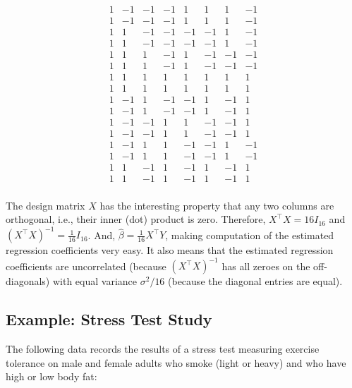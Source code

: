 \documentclass[
]{book}
\begin{document}
\[\begin{matrix}
 1 & -1 & -1 & -1 &  1& 1& 1& -1 \\
 1 & -1 & -1 & -1 &  1& 1& 1& -1 \\
 1 & 1 & -1 & -1 &  -1& -1& 1& -1 \\
 1 & 1 & -1 & -1 &  -1& -1& 1& -1 \\
 1 & 1 & 1 & -1 &  1& -1& -1& -1 \\
 1 & 1 & 1 & -1 &  1& -1& -1& -1 \\
 1 & 1 & 1 & 1 &  1& 1& 1& 1 \\
 1 & 1 & 1 & 1 &  1& 1& 1& 1 \\
 1 & -1 & 1 & -1 &  -1& 1& -1& 1 \\
 1 & -1 & 1 & -1 &  -1& 1& -1& 1 \\
 1 & -1 & -1 & 1 &  1& -1& -1& 1 \\
 1 & -1 & -1 & 1 &  1& -1& -1& 1 \\
 1 & -1 & 1 & 1 &  -1& -1& 1& -1 \\
 1 & -1 & 1 & 1 &  -1& -1& 1& -1 \\
 1 & 1 & -1 & 1 &  -1& 1& -1& 1 \\
 1 & 1 & -1 & 1 &  -1& 1& -1& 1 \\
 \end{matrix}
\]

The design matrix \(X\) has the interesting property that any two columns are orthogonal, i.e., their inner (dot) product is zero. Therefore, \(X^\top X = 16 I_{16}\) and \((X^\top X)^{-1} = \frac{1}{16}I_{16}\). And, \(\hat\beta = \frac{1}{16}X^\top Y\), making computation of the estimated regression coefficients very easy. It also means that the estimated regression coefficients are uncorrelated (because \((X^\top X)^{-1}\) has all zeroes on the off-diagonals) with equal variance \(\sigma^2 / 16\) (because the diagonal entries are equal).

\hypertarget{example-stress-test-study}{%
\subsection{Example: Stress Test Study}\label{example-stress-test-study}}

The following data records the results of a stress test measuring exercise tolerance on male and female adults who smoke (light or heavy) and who have high or low body fat:
\end{document}
